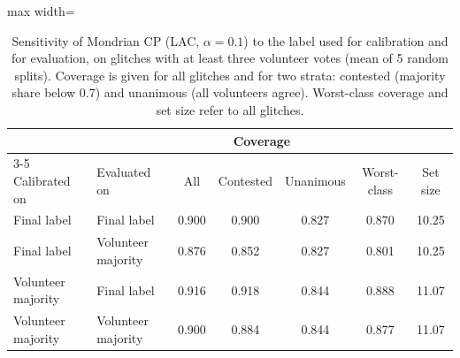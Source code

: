\begin{table}[!htb]
\caption{Sensitivity of Mondrian CP (LAC, $\alpha=0.1$) to the label used for calibration and for evaluation, on glitches with at
least three volunteer votes (mean of 5 random splits). Coverage is given for all glitches and for two strata: contested (majority
share below 0.7) and unanimous (all volunteers agree). Worst-class coverage and set size refer to all glitches.}\label{tab:e4}
\centering\scriptsize\setlength{\tabcolsep}{4pt}
\begin{adjustbox}{max width=\columnwidth}\begin{tabular}{llccccc}\toprule
 & & \multicolumn{3}{c}{Coverage} & & \\\cmidrule(lr){3-5}
Calibrated on & Evaluated on & All & Contested & Unanimous & Worst-class & Set size\\\midrule
Final label & Final label & 0.900 & 0.900 & 0.827 & 0.870 & 10.25\\
Final label & Volunteer majority & 0.876 & 0.852 & 0.827 & 0.801 & 10.25\\
Volunteer majority & Final label & 0.916 & 0.918 & 0.844 & 0.888 & 11.07\\
Volunteer majority & Volunteer majority & 0.900 & 0.884 & 0.844 & 0.877 & 11.07\\
\bottomrule
\end{tabular}\end{adjustbox}
\end{table}
